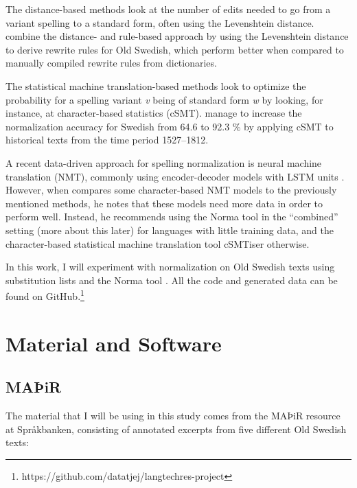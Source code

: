 \documentclass[11pt,a4paper]{article}
\begin{document}
The distance-based methods look at the number of edits needed to go from a variant spelling to a standard form, often using the Levenshtein distance. \citet{adesam:12} combine the distance- and rule-based approach by using the Levenshtein distance to derive rewrite rules for Old Swedish, which perform better when compared to manually compiled rewrite rules from dictionaries.

The statistical machine translation-based methods look to optimize the probability for a spelling variant \emph{v} being of standard form \emph{w} by looking, for instance, at character-based statistics (cSMT). \citet{pettersson:13} manage to increase the normalization accuracy for Swedish from 64.6 to 92.3 \% by applying cSMT to historical texts from the time period 1527–1812.    

A recent data-driven approach for spelling normalization is neural machine translation (NMT), commonly using encoder-decoder models with LSTM units \citep{bollmann:19}. However, when \citet{bollmann:19} compares some character-based NMT models to the previously mentioned methods, he notes that these models need more data in order to perform well. Instead, he recommends using the Norma tool in the ``combined'' setting (more about this later) for languages with little training data, and the character-based statistical machine translation tool cSMTiser otherwise.     

In this work, I will experiment with normalization on Old Swedish texts using substitution lists and the Norma tool \citep{bollmann:12}. All the code and generated data can be found on GitHub.\footnote{https://github.com/datatjej/langtechres-project}

\section{Material and Software}

\subsection{MAÞiR}
The material that I will be using in this study comes from the MAÞiR resource at Språkbanken, consisting of annotated excerpts from five different Old Swedish texts:
\end{document}
